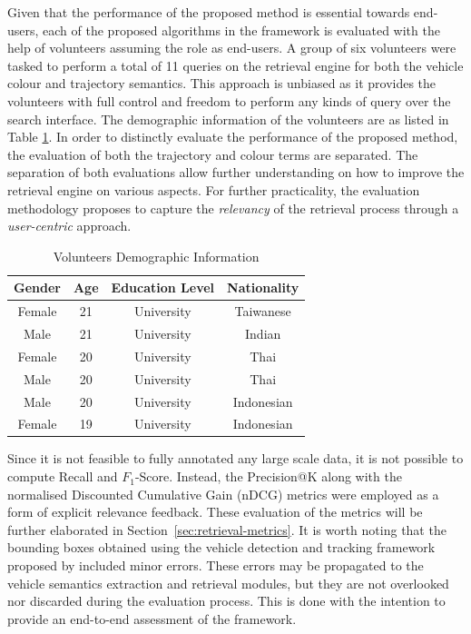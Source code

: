 Given that the performance of the proposed method is essential towards end-users, each of the proposed algorithms in the framework is evaluated with the help of volunteers assuming the role as end-users.
A group of six volunteers were tasked to perform a total of 11 queries on the retrieval engine for both the vehicle colour and trajectory semantics.
This approach is unbiased as it provides the volunteers with full control and freedom to perform any kinds of query over the search interface.
The demographic information of the volunteers are as listed in Table \ref{tab:volunteerdemo}.
In order to distinctly evaluate the performance of the proposed method, the evaluation of both the trajectory and colour terms are separated. The separation of both evaluations allow further understanding on how to improve the retrieval engine on various aspects. For further practicality, the evaluation methodology proposes to capture the \emph{relevancy} of the retrieval process through a \emph{user-centric} approach. 
\begin{table}[!ht] 
\centering
\caption {Volunteers Demographic Information}
\label{tab:volunteerdemo}
\begin{tabular}{|c|c|c|c|}
\hline
\textbf{Gender} & \textbf{Age} & \textbf{Education Level} & \textbf{Nationality} \\ \hline
Female          & 21           & University               & Taiwanese            \\ \hline
Male            & 21           & University               & Indian               \\ \hline
Female          & 20           & University               & Thai                 \\ \hline
Male            & 20           & University               & Thai                 \\ \hline
Male            & 20           & University               & Indonesian           \\ \hline
Female          & 19           & University               & Indonesian           \\ \hline
\end{tabular}
\end{table}

Since it is not feasible to fully annotated any large scale data, it is not possible to compute Recall and $F_1$-Score. Instead, the Precision@K along with the normalised Discounted Cumulative Gain (nDCG) metrics were employed as a form of explicit relevance feedback. These evaluation of the metrics will be further elaborated in Section~\ref{sec:retrieval-metrics}.
It is worth noting that the bounding boxes obtained using the vehicle detection and tracking framework proposed by \cite{lim2017} included minor errors. These errors may be propagated to the vehicle semantics extraction and retrieval modules, but they are not overlooked nor discarded during the evaluation process. This is done with the intention to provide an end-to-end assessment of the framework.

